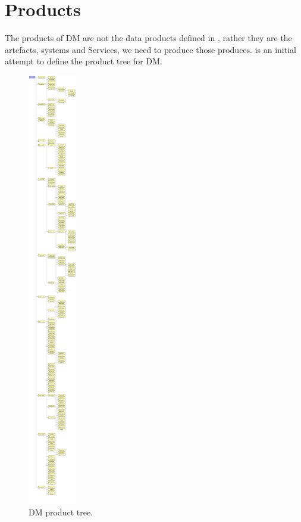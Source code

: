 \section{Products \label{sect:products}}

The products of DM are not the data products defined in , rather they are the artefacts, systems and Services,  we need to produce those produces.  is an initial attempt to define the product tree for DM. 

\begin{figure}[htbp]
	\begin{center}
		 \includegraphics[height=19cm]{ProductTree}
		 \caption{DM product tree. \label{fig:prods}}
	 \end{center}
 \end{figure}


